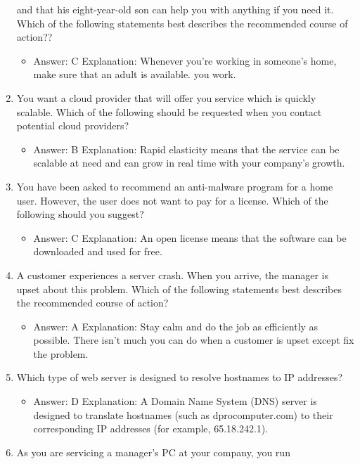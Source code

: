 \documentclass{article}
\begin{document}
\begin{enumerate}
and that his eight-year-old son can help you with anything if you
need it. Which of the following statements best describes the recommended
course of action??
    \begin{itemize}
        \item Answer: C
Explanation: Whenever you’re working in someone’s home, make sure that an adult is
available.
you work.
    \end{itemize}
    \item You want a cloud provider that will offer you service which is
quickly scalable. Which of the following should be requested when
you contact potential cloud providers?
    \begin{itemize}
        \item Answer: B
Explanation: Rapid elasticity means that the service can be scalable at need and can
grow in real time with your company’s growth.
    \end{itemize}
    \item You have been asked to recommend an anti-malware program for
a home user. However, the user does not want to pay for a license.
Which of the following should you suggest?
    \begin{itemize}
        \item Answer: C
Explanation: An open license means that the software can be downloaded and used for
free.
    \end{itemize}
    \item A customer experiences a server crash. When you arrive, the
manager is upset about this problem. Which of the following statements
best describes the recommended course of action?
    \begin{itemize}
        \item Answer: A
Explanation: Stay calm and do the job as efficiently as possible. There isn’t much you
can do when a customer is upset except fix the problem.
    \end{itemize}
    \item Which type of web server is designed to resolve hostnames to
IP addresses?
    \begin{itemize}
        \item Answer: D
Explanation: A Domain Name System (DNS) server is designed to translate hostnames
(such as dprocomputer.com) to their corresponding IP addresses (for example,
65.18.242.1).
    \end{itemize}
    \item As you are servicing a manager’s PC at your company, you run

\end{enumerate}
\end{document}
